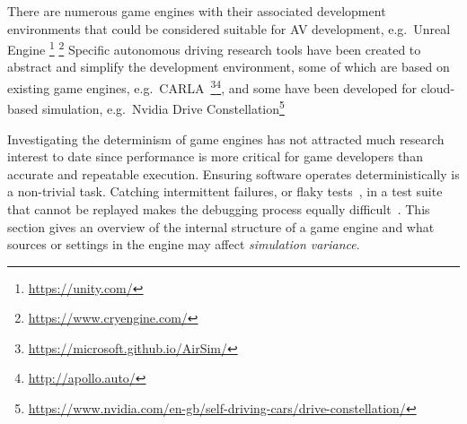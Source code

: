 There are numerous game engines with their associated development environments that could be considered suitable for AV development, e.g.\ Unreal Engine
\DIFdelbegin {}\DIFdelend \DIFaddbegin {}\footnote{\url{https://unity.com/}} \footnote{\url{https://www.cryengine.com/}} 
\DIFaddend Specific autonomous driving research tools have been created to abstract and simplify the development environment, some of which are based on existing game engines, e.g.\ CARLA~\DIFdelbegin {}\DIFdelend \DIFaddbegin {}\footnote{\url{https://microsoft.github.io/AirSim/}}\footnote{\url{http://apollo.auto/}}\DIFaddend , and some have been developed for cloud-based simulation, e.g.\ Nvidia Drive Constellation\DIFdelbegin {}\DIFdelend \DIFaddbegin \footnote{\url{https://www.nvidia.com/en-gb/self-driving-cars/drive-constellation/}}\DIFaddend 

Investigating the determinism of game engines has not attracted much research interest to date since performance is more critical for game developers than accurate and repeatable execution. Ensuring software operates deterministically is a non-trivial task.  Catching intermittent failures, or flaky tests~\cite{intermittently-failing-tests}, in a test suite that cannot be replayed makes the debugging process equally difficult~\cite{acm-q-rr-interview}. This section gives an overview of the internal structure of a game engine and what sources or settings in the engine may affect \textit{simulation variance}.

